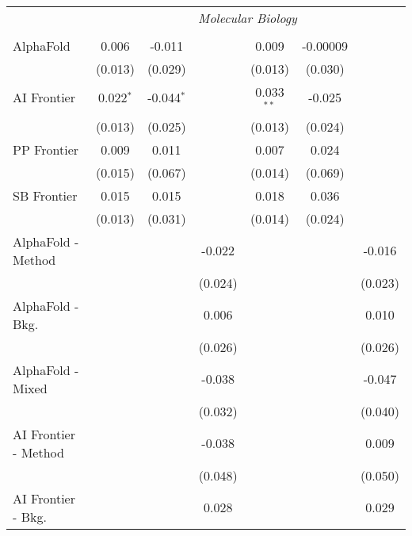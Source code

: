 \begin{tabular}{lcccccc}
 & \multicolumn{6}{c}{\textit{Molecular Biology}} \\ \\
   AlphaFold            & 0.006       & -0.011       &               & 0.009        & -0.00009 &   \\   
                        & (0.013)     & (0.029)      &               & (0.013)      & (0.030)  &   \\   
   AI Frontier          & 0.022$^{*}$ & -0.044$^{*}$ &               & 0.033$^{**}$ & -0.025   &   \\   
                        & (0.013)     & (0.025)      &               & (0.013)      & (0.024)  &   \\   
   PP Frontier          & 0.009       & 0.011        &               & 0.007        & 0.024    &   \\   
                        & (0.015)     & (0.067)      &               & (0.014)      & (0.069)  &   \\   
   SB Frontier          & 0.015       & 0.015        &               & 0.018        & 0.036    &   \\   
                        & (0.013)     & (0.031)      &               & (0.014)      & (0.024)  &   \\   
   AlphaFold - Method   &             &              & -0.022        &              &          & -0.016\\   
                        &             &              & (0.024)       &              &          & (0.023)\\   
   AlphaFold - Bkg.     &             &              & 0.006         &              &          & 0.010\\   
                        &             &              & (0.026)       &              &          & (0.026)\\   
   AlphaFold - Mixed    &             &              & -0.038        &              &          & -0.047\\   
                        &             &              & (0.032)       &              &          & (0.040)\\   
   AI Frontier - Method &             &              & -0.038        &              &          & 0.009\\   
                        &             &              & (0.048)       &              &          & (0.050)\\   
   AI Frontier - Bkg.   &             &              & 0.028         &              &          & 0.029\\   

\end{tabular}
